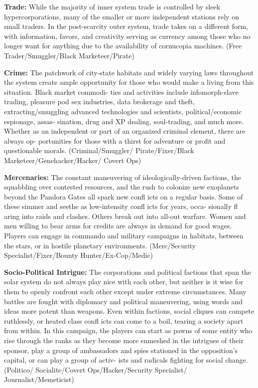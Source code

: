 \textbf{Trade:} While the majority of inner system trade is 
controlled by sleek hypercorporations, many of the 
smaller or more independent stations rely on small 
traders. In the post-scarcity outer system, trade takes 
on a different form, with information, favors, and 
creativity serving as currency among those who no 
longer want for anything due to the availability of 
cornucopia machines. (Free Trader/Smuggler/Black 
Marketeer/Pirate)

\textbf{Crime:} The patchwork of city-state habitats and 
widely varying laws throughout the system create 
ample opportunity for those who would make a 
living from this situation. Black market commodi-
ties and activities include infomorph-slave trading, 
pleasure pod sex industries, data brokerage and 
theft, extracting/smuggling advanced technologies 
and scientists, political/economic espionage, assas-
sination, drug and XP dealing, soul-trading, and 
much more. Whether as an independent or part of 
an organized criminal element, there are always op-
portunities for those with a thirst for adventure or 
profit and questionable morals. (Criminal/Smuggler/
Pirate/Fixer/Black Marketeer/Genehacker/Hacker/
Covert Ops)

\textbf{Mercenaries:} The constant maneuvering of 
ideologically-driven factions, the squabbling over 
contested resources, and the rush to colonize new 
exoplanets beyond the Pandora Gates all spark new 
confl icts on a regular basis. Some of these simmer 
and seethe as low-intensity confl icts for years, occa-
sionally fl aring into raids and clashes. Others break 
out into all-out warfare. Women and men willing 
to bear arms for credits are always in demand for 
good wages. Players can engage in commando and 
military campaigns in habitats, between the stars, or 
in hostile planetary environments. (Merc/Security 
Specialist/Fixer/Bounty Hunter/Ex-Cop/Medic)

\textbf{Socio-Political Intrigue:} The corporations and 
political factions that span the solar system do not 
always play nice with each other, but neither is it 
wise for them to openly confront each other except 
under extreme circumstances. Many battles are 
fought with diplomacy and political maneuvering, 
using words and ideas more potent than weapons. 
Even within factions, social cliques can compete 
ruthlessly, or heated class confl icts can come to 
a boil, tearing a society apart from within. In this 
campaign, the players can start as pawns of some 
entity who rise through the ranks as they become 
more enmeshed in the intrigues of their sponsor, play 
a group of ambassadors and spies stationed in the 
opposition's capital, or can play a group of activ-
ists and radicals fighting for social change. (Politico/
Socialite/Covert Ops/Hacker/Security Specialist/
Journalist/Memeticist)

